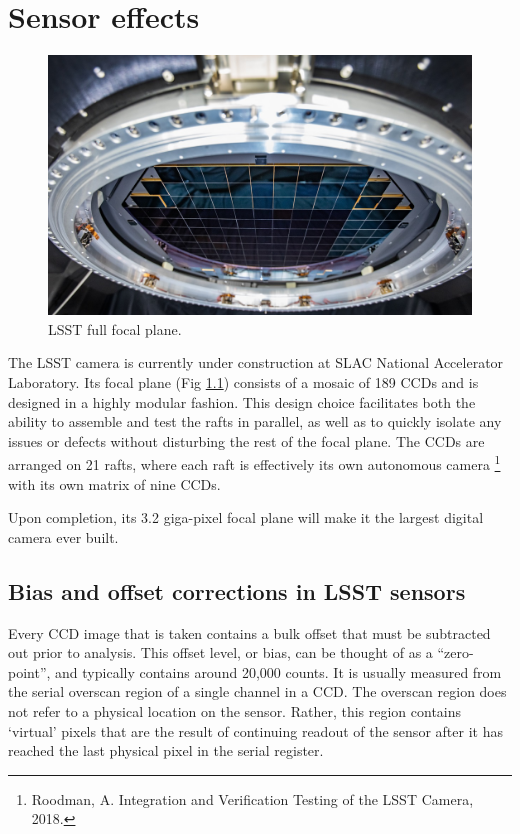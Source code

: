 \chapter{Sensor effects}
\graphicspath{ {./images/} }


\begin{figure}[h]
    \centering
    \includegraphics{lsstcam-focalplane-lowres.jpg}
    \caption{LSST full focal plane.}
    \label{fig:focalplane}
\end{figure}

The LSST camera is currently under construction at SLAC National Accelerator Laboratory. Its focal plane (Fig \ref{fig:focalplane}) consists of a mosaic of 189 CCDs and is designed in a highly modular fashion. This design choice facilitates both the ability to assemble and test the rafts in parallel, as well as to quickly isolate any issues or defects without disturbing the rest of the focal plane. The CCDs are arranged on 21 rafts, where each raft is effectively its own autonomous camera \footnote{Roodman, A. Integration and Verification Testing of the LSST Camera, 2018.} with its own matrix of nine CCDs. 




Upon completion, its 3.2 giga-pixel focal plane will make it the largest digital camera ever built. 

\section{Bias and offset corrections in LSST sensors}

Every CCD image that is taken contains a bulk offset that must be subtracted out prior to analysis. This offset level, or bias, can be thought of as a ``zero-point'', and typically contains around 20,000 counts. It is usually measured from the serial overscan region of a single channel in a CCD. The overscan region does not refer to a physical location on the sensor. Rather, this region contains ‘virtual’ pixels that are the result of continuing readout of the sensor after it has reached the last physical pixel in the serial register.

